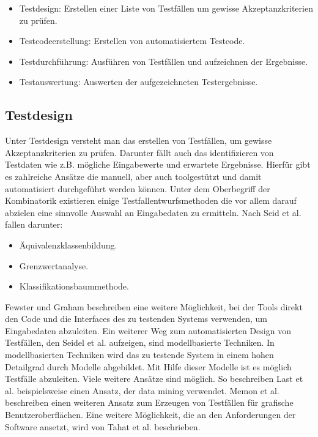 \begin{itemize}
	  \itemsep0pt
      \item Testdesign: Erstellen einer Liste von Testfällen um gewisse Akzeptanzkriterien zu prüfen.
      \item Testcodeerstellung: Erstellen von automatisiertem Testcode.
      \item Testdurchführung: Ausführen von Testfällen und aufzeichnen der Ergebnisse.
      \item Testauswertung: Auswerten der aufgezeichneten Testergebnisse.         
\end{itemize}

\subsection{Testdesign}
\label{subsec:testdesign}
Unter Testdesign versteht man das erstellen von Testfällen, um gewisse Akzeptanzkriterien zu prüfen. Darunter fällt auch das identifizieren von Testdaten wie z.B. mögliche Eingabewerte und erwartete Ergebnisse. Hierfür gibt es zahlreiche Ansätze die manuell, aber auch toolgestützt und damit automatisiert durchgeführt werden können.
Unter dem Oberbegriff der Kombinatorik existieren einige Testfallentwurfsmethoden die vor allem darauf abzielen eine sinnvolle Auswahl an Eingabedaten zu ermitteln.
Nach Seid et al. fallen darunter: \cite[Seite 27]{seidl_basiswissen_2012}
\begin{itemize}
	  \itemsep0pt
      \item Äquivalenzklassenbildung.
      \item Grenzwertanalyse.
      \item Klassifikationsbaummethode.
\end{itemize}
Fewster und Graham \cite[Seite 19 ff.]{fewster_software_1999} beschreiben eine weitere Möglichkeit, bei der Tools direkt den Code und die Interfaces des zu testenden Systems verwenden, um Eingabedaten abzuleiten.
Ein weiterer Weg zum automatisierten Design von Testfällen, den Seidel et al. aufzeigen, \cite[Seite 33]{seidl_basiswissen_2012} sind modellbasierte Techniken. In modellbasierten Techniken wird das zu testende System in einem hohen Detailgrad durch Modelle abgebildet. Mit Hilfe dieser Modelle ist es möglich Testfälle abzuleiten.
Viele weitere Ansätze sind möglich. So beschreiben Last et al. beispielsweise einen Ansatz, der data mining verwendet. \cite{last_data_2003}
Memon et al. beschreiben einen weiteren Ansatz zum Erzeugen von Testfällen für grafische Benutzeroberflächen. \cite{memon_using_1999}
Eine weitere Möglichkeit, die an den Anforderungen der Software ansetzt, wird von Tahat et al. beschrieben. \cite{tahat_requirement-based_2001}


